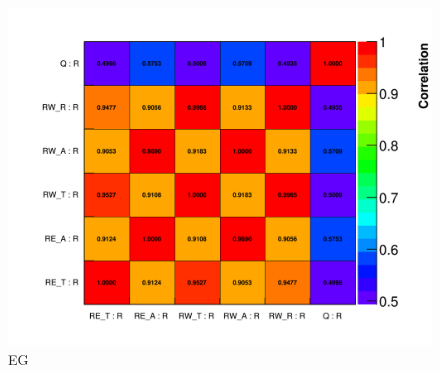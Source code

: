 \begin{figure}[]
\centering
\includegraphics[width=\textwidth]{MethodType_Average_CorrelationMatrixPlot_R_R_EG}
\caption{EG}
\label{fig:}
\end{figure}



